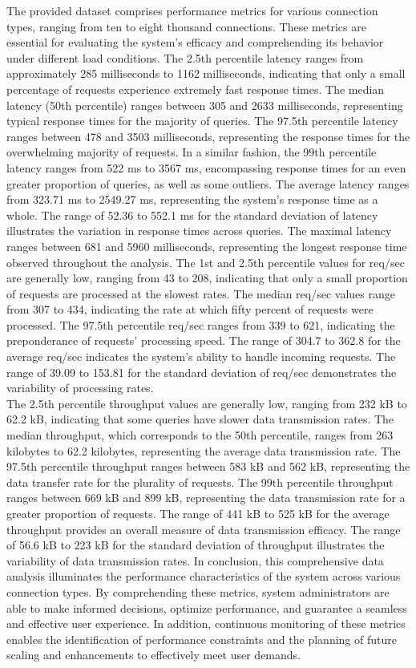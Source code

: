 \documentclass[../Main.tex]{subfiles}
\begin{document}
The provided dataset comprises performance metrics for various connection types, ranging from ten to eight thousand connections. These metrics are essential for evaluating the system's efficacy and comprehending its behavior under different load conditions. The 2.5th percentile latency ranges from approximately 285 milliseconds to 1162 milliseconds, indicating that only a small percentage of requests experience extremely fast response times. The median latency (50th percentile) ranges between 305 and 2633 milliseconds, representing typical response times for the majority of queries. The 97.5th percentile latency ranges between 478 and 3503 milliseconds, representing the response times for the overwhelming majority of requests. In a similar fashion, the 99th percentile latency ranges from 522 ms to 3567 ms, encompassing response times for an even greater proportion of queries, as well as some outliers. The average latency ranges from 323.71 ms to 2549.27 ms, representing the system's response time as a whole. The range of 52.36 to 552.1 ms for the standard deviation of latency illustrates the variation in response times across queries. The maximal latency ranges between 681 and 5960 milliseconds, representing the longest response time observed throughout the analysis. The 1st and 2.5th percentile values for req/sec are generally low, ranging from 43 to 208, indicating that only a small proportion of requests are processed at the slowest rates. The median req/sec values range from 307 to 434, indicating the rate at which fifty percent of requests were processed. The 97.5th percentile req/sec ranges from 339 to 621, indicating the preponderance of requests' processing speed. The range of 304.7 to 362.8 for the average req/sec indicates the system's ability to handle incoming requests. The range of 39.09 to 153.81 for the standard deviation of req/sec demonstrates the variability of processing rates.\\
\indent The 2.5th percentile throughput values are generally low, ranging from 232 kB to 62.2 kB, indicating that some queries have slower data transmission rates. The median throughput, which corresponds to the 50th percentile, ranges from 263 kilobytes to 62.2 kilobytes, representing the average data transmission rate. The 97.5th percentile throughput ranges between 583 kB and 562 kB, representing the data transfer rate for the plurality of requests. The 99th percentile throughput ranges between 669 kB and 899 kB, representing the data transmission rate for a greater proportion of requests. The range of 441 kB to 525 kB for the average throughput provides an overall measure of data transmission efficacy. The range of 56.6 kB to 223 kB for the standard deviation of throughput illustrates the variability of data transmission rates. In conclusion, this comprehensive data analysis illuminates the performance characteristics of the system across various connection types. By comprehending these metrics, system administrators are able to make informed decisions, optimize performance, and guarantee a seamless and effective user experience. In addition, continuous monitoring of these metrics enables the identification of performance constraints and the planning of future scaling and enhancements to effectively meet user demands.
\end{document}

